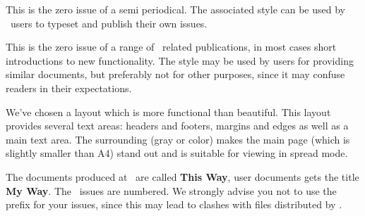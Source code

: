 
%
%

\usemodule[mag-01]

\startbuffer[abstract]
    This is the zero issue of a semi periodical. The associated style can be used
    by \CONTEXT\ users to typeset and publish their own issues.
\stopbuffer

\startdocument
  [title={Introduction},
   subtitle={Welcome},
   author={Hans Hagen},
   affiliation=PRAGMA ADE,
   date=Januari 2003,
   number=0 \MKIV]

This is the zero issue of a range of \CONTEXT\ related publications, in most
cases short introductions to new functionality. The style may be used by users
for providing similar documents, but preferably not for other purposes, since it
may confuse readers in their expectations.

We've chosen a layout which is more functional than beautiful. This layout
provides several text areas: headers and footers, margins and edges as well as a
main text area. The surrounding (gray or color) makes the main page (which is
slightly smaller than A4) stand out and is suitable for viewing in spread mode.

The documents produced at \PRAGMA\ are called {\bf This Way}, user documents gets
the title {\bf My Way}. The \PRAGMA\ issues are numbered. We strongly advise you
not to use the  prefix for your issues, since this may lead to
clashes with files distributed by \PRAGMA.

\stopdocument
